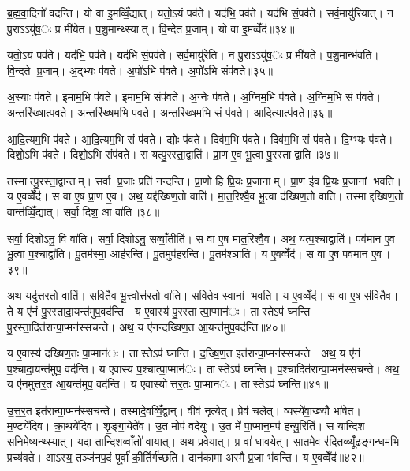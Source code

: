 
ब्र॒ह्म॒वा॒दिनो॑ वदन्ति। यो वा इ॒मव्विँ॒द्यात्। यतो॒ऽयं पव॑ते। यद॑भि॒ पव॑ते। यद॑भि सं॒पव॑ते। सर्व॒मायु॑रियात्। न पु॒राऽऽयु॑ष॒ः प्र मी॑येत। प॒शु॒मान्थ्स्यात्। वि॒न्देत॑ प्र॒जाम्। यो वा इ॒मव्वेँद॑॥३४॥

यतो॒ऽयं पव॑ते। यद॑भि॒ पव॑ते। यद॑भि सं॒पव॑ते। सर्व॒मायु॑रेति। न पु॒राऽऽयु॑ष॒ः प्र मी॑यते। प॒शु॒मान्भ॑वति। वि॒न्दते प्र॒जाम्। अ॒द्भ्यः प॑वते। अ॒पो॑ऽभि प॑वते। अ॒पो॑ऽभि संप॑वते॥३५॥

अ॒स्याः प॑वते। इ॒माम॒भि प॑वते। इ॒माम॒भि संप॑वते। अ॒ग्नेः प॑वते। अ॒ग्निम॒भि प॑वते। अ॒ग्निम॒भि सं प॑वते। अ॒न्तरि॑ख्षात्पवते। अ॒न्तरि॑ख्षम॒भि प॑वते। अ॒न्तरि॑ख्षम॒भि सं प॑वते। आ॒दि॒त्यात्प॑वते॥३६॥

आ॒दि॒त्यम॒भि प॑वते। आ॒दि॒त्यम॒भि सं प॑वते। द्योः प॑वते। दिव॑म॒भि प॑वते। दिव॑म॒भि सं प॑वते। दि॒ग्भ्यः प॑वते। दिशो॒ऽभि प॑वते। दिशो॒ऽभि संप॑वते। स यत्पु॒रस्ता॒द्वाति॑। प्रा॒ण ए॒व भू॒त्वा पु॒रस्ताद्वाति॥३७॥

तस्मात्पु॒रस्ता॒द्वान्तम्। सर्वा प्र॒जाः प्रति॑ नन्दन्ति। प्रा॒णो हि प्रि॒यः प्र॒जानाम्। प्रा॒ण इ॑व प्रि॒यः प्र॒जानां भवति। य ए॒वव्वेँद॑। स वा ए॒ष प्रा॒ण ए॒व। अथ॒ यद्द॑ख्षिण॒तो वाति॑। मा॒त॒रिश्वै॒व भू॒त्वा द॑ख्षिण॒तो वा॑ति। तस्माद्दख्षिण॒तो वान्त॑व्विँ॒द्यात्। सर्वा॒ दिश॒ आ वा॑ति॥३८॥

सर्वा॒ दिशोऽनु॒ वि वा॑ति। सर्वा॒ दिशोऽनु॒ सव्वाँ॒तीति॑। स वा ए॒ष मा॑त॒रिश्वै॒व। अथ॒ यत्प॒श्चाद्वाति॑। पव॑मान ए॒व भू॒त्वा प॒श्चाद्वा॑ति। पू॒तम॑स्मा॒ आह॑रन्ति। पू॒तमुप॑हरन्ति। पू॒तम॑श्ञाति। य ए॒वव्वेँद॑। स वा ए॒ष पव॑मान ए॒व॥३९॥

अथ॒ यदु॑त्तर॒तो वाति॑। स॒वि॒तैव भू॒त्त्वोत्त॑र॒तो वा॑ति। स॒वि॒तेव॒ स्वानां भवति। य ए॒वव्वेँद॑। स वा ए॒ष स॑वि॒तैव। ते य ए॑नं पु॒रस्ता॑दा॒यन्त॑मुप॒वद॑न्ति। य ए॒वास्य॑ पु॒रस्तात्पा॒प्मान॑ः। तास्तेऽप॑ घ्नन्ति। पु॒रस्ता॒दित॑रान्पा॒प्मन॑स्सचन्ते। अथ॒ य ए॑नन्दख्षिण॒त आ॒यन्त॑मुप॒वद॑न्ति॥४०॥

य ए॒वास्य॑ दख्षिण॒तः पा॒प्मान॑ः। तास्तेऽप॑ घ्नन्ति। द॒ख्षि॒ण॒त इत॑रान्पा॒प्मन॑स्सचन्ते। अथ॒ य ए॑नं प॒श्चादा॒यन्त॑मुप॒ वद॑न्ति। य ए॒वास्य॑ प॒श्चात्पा॒प्मान॑ः। तास्तेऽप॑ घ्नन्ति। प॒श्चादित॑रान्पा॒प्मन॑स्सचन्ते। अथ॒ य ए॑नमुत्तर॒त आ॒यन्त॑मुप॒ वद॑न्ति। य ए॒वास्योत्तर॒तः पा॒प्मान॑ः। तास्तेऽप॑ घ्नन्ति॥४१॥

उ॒त्त॒र॒त इत॑रान्पा॒प्मन॑स्सचन्ते। तस्मा॑दे॒वव्विँ॒द्वान्। वीव॑ नृत्येत्। प्रेव॑ चलेत्। व्यस्ये॑वा॒ख्ष्यौ भा॑षेत। म॒ण्टये॑दिव। क्रा॒थये॑दिव। शृ॒ङ्गा॒येते॑व। उ॒त मोप॑ वदेयुः। उ॒त मे॑ पा॒प्मान॒मप॑ हन्यु॒रिति॑। स यान्दिश स॒निमे॒ष्यन्थ्स्यात्। य॒दा तान्दिश॒व्वाँतो॑ वा॒यात्। अथ॒ प्रवे॒यात्। प्र वा॑ धावयेत्। सा॒तमे॒व र॑दि॒तव्व्यूँ॑ढङ्ग॒न्धम॒भि प्रच्य॑वते। आऽस्य॒ तञ्ज॑नप॒दं पूर्वा॑ की॒र्तिर्ग॑च्छति। दान॑कामा अस्मै प्र॒जा भ॑वन्ति। य ए॒वव्वेँद॑॥४२॥

